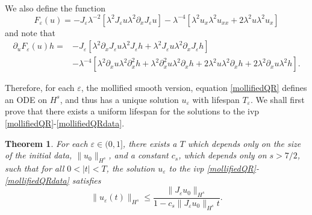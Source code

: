 \documentclass[reqno]{amsart}
\theoremstyle{plain}
\newtheorem{theorem}{Theorem}[section]
\numberwithin{equation}{section}
\newcommand{\p}{\partial}
\newcommand{\ee}{\varepsilon}
\begin{document}
We also define the function
\[
F_\ee(u) = -J_\ee \lambda^{-2} [ \lambda ^2J_\ee u \lambda ^2\partial_x J_\ee u ] 
  - \lambda^{-4} [   \lambda^2 u_x \lambda^2 u_{xx}  + 2 
 \lambda ^2  u \lambda^2 u_x   ]
\]
and note that
\begin{align*}
\p_uF_\ee(u)h =&   -J_\ee[\lambda^2\p_xJ_\ee u\lambda^2 J_\ee h+\lambda^2 J_\ee u \lambda ^2\p_x J_\ee h] 
\\ &  - \lambda^{-4}[\lambda^2\p_xu\lambda^2 \p_x^2h+\lambda^2\p_x^2u\lambda^2\p_xh+2\lambda^2 u\lambda^2\p_x h+2\lambda^2\p_xu\lambda^2 h].
\end{align*}

Therefore, for each $\ee$, the mollified smooth version, equation \eqref{mollifiedQR} defines an ODE on $H^s$, and thus has a unique solution $u_\ee$ with lifespan $T_\ee$. We shall first prove that there exists a uniform lifespan for the solutions to the ivp \ref{mollifiedQR}-\ref{mollifiedQRdata}. 
\begin{theorem}
For each $\ee \in (0,1]$, there exists a $T $ which depends only on the size of the initial data, $\|u_0\|_{H^s}$, and a constant $c_s$, which depends only on $s>7/2$, such that for all $0<|t|<T$, the solution $u_\ee$ to the ivp \ref{mollifiedQR}-\ref{mollifiedQRdata} satisfies
$$
\|u_\ee (t) \|_{H^s} \le \frac{\|J_\ee u_0\|_{H^s}}{1-c_s\|J_\ee u_0\|_{H^s} t}.
$$
\end{theorem}
\end{document}
